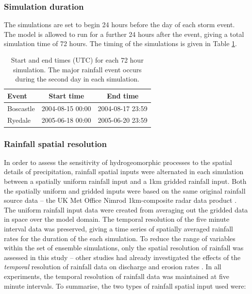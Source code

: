 \subsubsection{Simulation duration}

The simulations are set to begin 24 hours before the day of each storm event. The model is allowed to run for a further 24 hours after the event, giving a total simulation time of 72 hours. The timing of the simulations is given in Table \ref{table_start_time_hydrog_sims}.

\begin{table}[htbp]
\begin{tabular}{l c  c}
\textbf{Event}  &   \textbf{Start time} &  \textbf{End time} \\
\hline 
Boscastle          &  2004-08-15 00:00  &  2004-08-17 23:59 \\
Ryedale             &  2005-06-18 00:00  &  2005-06-20 23:59 \\
\hline

\end{tabular}
\caption{Start and end times (UTC) for each 72 hour simulation. The major rainfall event occurs during the second day in each simulation.}
\label{table_start_time_hydrog_sims}
\end{table}

\subsubsection{Rainfall spatial resolution}
In order to assess the sensitivity of hydrogeomorphic processes to the spatial details of precipitation, rainfall spatial inputs were alternated in each simulation between a spatially uniform rainfall input and a 1km gridded rainfall input. Both the spatially uniform and gridded inputs were based on the same original rainfall source data -- the UK Met Office Nimrod 1km-composite radar data product \citep{metoffice2003nimrod}. The uniform rainfall input data were created from averaging out the gridded data in space over the model domain. The temporal resolution of the five minute interval data was preserved, giving a time series of spatially averaged rainfall rates for the duration of the each simulation. To reduce the range of variables within the set of ensemble simulations, only the spatial resolution of rainfall was assessed in this study -- other studies had already investigated the effects of the \textit{temporal} resolution of rainfall data on discharge and erosion rates \citep{nicotina2008impact,Coulthard2013,coulthard2016sensitivity}. In all experiments, the temporal resolution of rainfall data was maintained at five minute intervals. To summarise, the two types of rainfall spatial input used were: 

